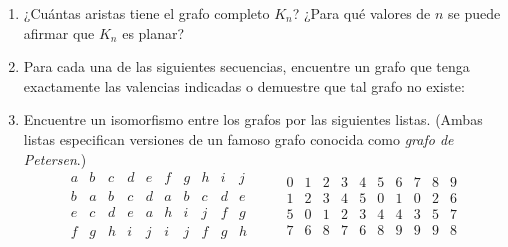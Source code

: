 \documentclass[a4paper,12pt,twoside,spanish,reqno]{amsbook}
\numberwithin{equation}{section}
\begin{document}
\begin{enumerate}
\item  ¿Cuántas aristas tiene el  grafo completo $K_n$? ¿Para qué valores de $n$ se puede afirmar que $K_n$ es planar?

\item Para cada una de las siguientes secuencias, encuentre un grafo que tenga exactamente las valencias indicadas o demuestre que tal grafo no existe:


\item Encuentre un isomorfismo entre los grafos por las siguientes listas. (Ambas listas especifican versiones de un famoso grafo conocida como {\it grafo de Petersen}.)
$$
\begin{matrix}
a&b&c&d&e&f&g&h&i&j\\ \hline
b&a&b&c&d&a&b&c&d&e\\
e&c&d&e&a&h&i&j&f&g\\
f&g&h&i&j&i&j&f&g&h
\end{matrix}
\qquad \begin{matrix}
0&1&2&3&4&5&6&7&8&9\\ \hline
1&2&3&4&5&0&1&0&2&6\\
5&0&1&2&3&4&4&3&5&7\\
7&6&8&7&6&8&9&9&9&8
\end{matrix}
$$


\end{enumerate}
\end{document}
